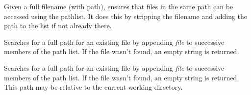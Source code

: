 \label{wxpathlistensurefileaccessible}


Given a full filename (with path), ensures that files in the same path
can be accessed using the pathlist. It does this by stripping the
filename and adding the path to the list if not already there.


\label{wxpathlistfindabsolutepath}


Searches for a full path for an existing file by appending {\it file} to
successive members of the path list.  If the file wasn't found, an empty
string is returned.


\label{wxpathlistfindvalidpath}


Searches for a full path for an existing file by appending {\it file} to
successive members of the path list.  If the file wasn't found, an empty string
is returned. This path may be relative to the current working directory.

